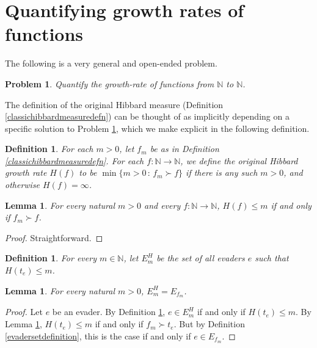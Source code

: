 \documentclass{article}
\newtheorem{definition}[theorem]{Definition}
\newtheorem{lemma}[theorem]{Lemma}
\newtheorem{problem}[theorem]{Problem}
\begin{document}
\section{Quantifying growth rates of functions}
\label{growthratesection}

The following is a very general and open-ended problem.

\begin{problem}
\label{bigoproblem}
    Quantify the growth-rate of functions from $\mathbb N$ to $\mathbb N$.
\end{problem}

The definition of the original Hibbard measure
(Definition \ref{classichibbardmeasuredefn})
can be thought of as implicitly depending on a specific solution to Problem
\ref{bigoproblem}, which we make explicit in the following definition.

\begin{definition}
\label{hibbardgrowthratedefn}
    For each $m>0$, let $f_m$ be as in Definition \ref{classichibbardmeasuredefn}.
    For each $f:\mathbb N\to\mathbb N$, we define the \emph{original Hibbard growth rate}
    $H(f)$ to be $\min\{m>0\,:\,f_m\succ f\}$ if there is any such $m>0$, and otherwise
    $H(f)=\infty$.
\end{definition}

\begin{lemma}
\label{straightfwdtechnicallemma}
    For every natural $m>0$ and every $f:\mathbb N\to\mathbb N$,
    $H(f)\leq m$ if and only if $f_m\succ f$.
\end{lemma}

\begin{proof}
    Straightforward.
\end{proof}

\begin{definition}
\label{variationondefinitionofEdefn}
    For every $m\in\mathbb N$, let $E^H_m$
    be the set of all evaders $e$ such that $H(t_e)\leq m$.
\end{definition}

\begin{lemma}
\label{equivalenceoftwoevadersetslemma}
    For every natural $m>0$, $E^H_m=E_{f_m}$.
\end{lemma}

\begin{proof}
    Let $e$ be an evader. By Definition \ref{variationondefinitionofEdefn},
    $e\in E^H_m$ if and only if $H(t_e)\leq m$.
    By Lemma \ref{straightfwdtechnicallemma}, $H(t_e)\leq m$ if and only if
    $f_m\succ t_e$. But by Definition \ref{evadersetdefinition}, this is the
    case if and only if $e\in E_{f_m}$.
\end{proof}
\end{document}
